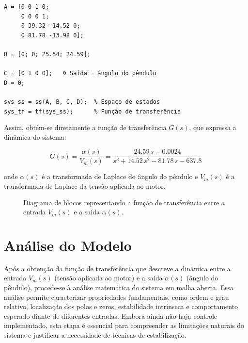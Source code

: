 \documentclass[9pt,a4paper,twocolumn,twoside]{tau-class/tau}
\begin{document}
\begin{verbatim}
A = [0 0 1 0;
     0 0 0 1;
     0 39.32 -14.52 0;
     0 81.78 -13.98 0];

B = [0; 0; 25.54; 24.59];

C = [0 1 0 0];   % Saída = ângulo do pêndulo
D = 0;

sys_ss = ss(A, B, C, D);  % Espaço de estados
sys_tf = tf(sys_ss);      % Função de transferência
\end{verbatim}

Assim, obtém-se diretamente a função de transferência $G(s)$, que expressa a 
dinâmica do sistema:

\begin{equation}
    G(s) = \frac{\alpha(s)}{V_m(s)}
          = \frac{24.59\,s - 0.0024}{s^3 + 14.52\,s^2 - 81.78\,s - 637.8}
\end{equation}

onde $\alpha(s)$ é a transformada de Laplace do ângulo do pêndulo e $V_m(s)$ é a 
transformada de Laplace da tensão aplicada ao motor.


\begin{figure}[H]
    \centering
    \caption{Diagrama de blocos representando a função de transferência entre a entrada $V_m(s)$ e a saída $\alpha(s)$.}
    \label{fig:tf_pendulo}
\end{figure}




\section{Análise do Modelo}
Após a obtenção da função de transferência que descreve a dinâmica entre a entrada $V_m(s)$ (tensão aplicada ao motor) e a saída $\alpha(s)$ (ângulo do pêndulo), procede-se à análise matemática do sistema em malha aberta. Essa análise permite caracterizar propriedades fundamentais, como ordem e grau relativo, localização dos polos e zeros, estabilidade intrínseca e comportamento esperado diante de diferentes entradas. Embora ainda não haja controle implementado, esta etapa é essencial para compreender as limitações naturais do sistema e justificar a necessidade de técnicas de estabilização.
\end{document}
